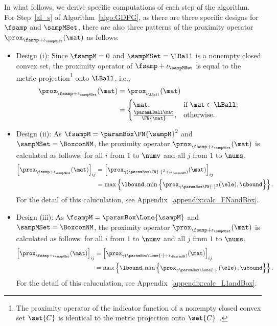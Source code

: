 \documentclass[journal]{IEEEtran}
\begin{document}
In what follows, we derive specific computations of each step of the algorithm.
For Step~\ref{al_s} of Algorithm~\ref{algo:GDPG}, as there are three specific designs for $\fsamp$ and $\sampMSet$, there are also three patterns of the proximity operator $\prox_{\fsamp + \iota_{\sampMSet}}(\mat)$ as follows:
\begin{itemize}[align=parleft, left=1.1mm, labelsep=1.1mm, itemindent=0mm]
    \item Design (i): Since $\fsampM = 0$ and $\sampMSet = \LBall$ is a nonempty closed convex set, the proximity operator of $\fsamp + \iota_{\sampMSet}$ is equal to the metric projection\footnote{The proximity operator of the indicator function of a nonempty closed convex set $\set{C}$ is identical to the metric projection onto $\set{C}$~\cite{bauschke2011convex}.} onto $\LBall$, i.e.,
    \begin{align}
        \label{eq:proj_Fball}
        \prox_{\fsamp + \iota_{\sampMSet}}(\mat)
        &= \prox_{\iota_{\LBall}} (\mat) \nonumber \\
        &= \begin{cases}
            \mat, & \mathrm{if} \: \mat \in \LBall; \\
            \frac{\paramLBall \mat}{\FN{\mat}}, & \mathrm{otherwise}.
        \end{cases}
    \end{align}
    \item Design (ii): As $\fsampM = \paramBox \FN{\sampM}^2$ and $\sampMSet = \BoxconNM$, the proximity operator $\prox_{\fsamp + \iota_{\sampMSet}}(\mat)$ is calculated as follows: for all $i$ from $1$ to $\numv$ and all $j$ from $1$ to $\nums$,
    \begin{align}
        \label{eq:proj_FNandBox}
        \left[\prox_{\fsamp + \iota_{\sampMSet}}(\mat)\right]_{ij}
        &= \left[\prox_{\gamma( \paramBox \FN{\cdot}^2 + \iota_{\BoxconNM})} (\mat)\right]_{ij} \nonumber \\
        &= \max \left\{ \lbound, \min \left\{ \prox_{\gamma \paramBox \FN{\cdot}^2} (\ele), \ubound \right\}\right\}.
    \end{align}
    For the detail of this caluculation, see Appendix~\ref{appendix:calc_FNandBox}.
    \item Design (iii): As $\fsampM = \paramBox \Lone{\sampM}$ and $\sampMSet = \BoxconNM$, the proximity operator $\prox_{\fsamp + \iota_{\sampMSet}}(\mat)$ is calculated as follows: for all $i$ from $1$ to $\numv$ and all $j$ from $1$ to $\nums$,
    \begin{align}
        \label{eq:proj_L1andBox}
        \left[\prox_{\fsamp + \iota_{\sampMSet}}(\mat)\right]_{ij}
        &= \left[\prox_{\gamma( \paramBox \Lone{\cdot} + \iota_{\BoxconNM})} (\mat)\right]_{ij} \nonumber \\
        &= \max \left\{ \lbound, \min\left\{ \prox_{\gamma \paramBox \Lone{\cdot}}\left(\ele\right), \ubound \right\}\right\}.
    \end{align}
    For the detail of this caluculation, see Appendix~\ref{appendix:calc_L1andBox}.
\end{itemize}
\end{document}
